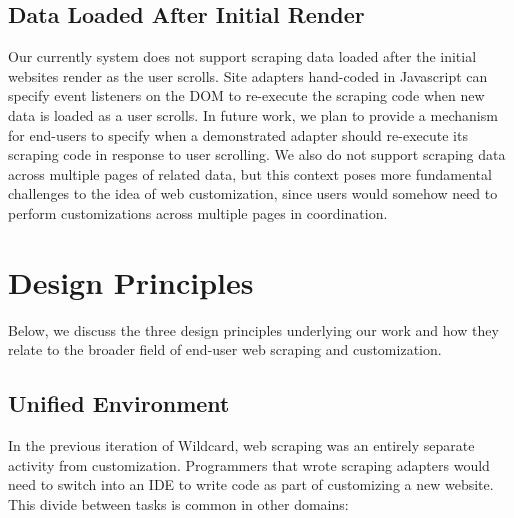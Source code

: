 \documentclass[sigconf,10pt]{acmart}
\begin{document}
\hypertarget{data-loaded-after-initial-render}{%
\subsection{Data Loaded After Initial
Render}\label{data-loaded-after-initial-render}}

Our currently system does not support scraping data loaded after the
initial websites render as the user scrolls. Site adapters hand-coded in
Javascript can specify event listeners on the DOM to re-execute the
scraping code when new data is loaded as a user scrolls. In future work,
we plan to provide a mechanism for end-users to specify when a
demonstrated adapter should re-execute its scraping code in response to
user scrolling. We also do not support scraping data across multiple
pages of related data, but this context poses more fundamental
challenges to the idea of web customization, since users would somehow
need to perform customizations across multiple pages in coordination.

\hypertarget{sec:design-principles}{%
\section{Design Principles}\label{sec:design-principles}}

Below, we discuss the three design principles underlying our work and
how they relate to the broader field of end-user web scraping and
customization.

\hypertarget{unified-environment}{%
\subsection{Unified Environment}\label{unified-environment}}

In the previous iteration of Wildcard, web scraping was an entirely
separate activity from customization. Programmers that wrote scraping
adapters would need to switch into an IDE to write code as part of
customizing a new website. This divide between tasks is common in other
domains:
\end{document}
